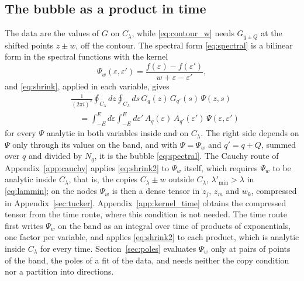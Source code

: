 \documentclass[aps,prb,reprint,a4paper]{revtex4-2}
\begin{document}
\subsection{The bubble as a product in time}
\label{sec:time}

The data are the values of $G$ on $C_\lambda$, while \eqref{eq:contour_w} needs $G_{q\pm Q}$ at the shifted points $z\pm w$, off the contour. The spectral form \eqref{eq:spectral} is a bilinear form in the spectral functions with the kernel
\begin{equation}
  \Psi_w(\varepsilon,\varepsilon')=\frac{f(\varepsilon)-f(\varepsilon')}{w+\varepsilon-\varepsilon'},
  \label{eq:kernel_psi}
\end{equation}
and \eqref{eq:shrink}, applied in each variable, gives
\begin{equation}
  \begin{aligned}
  &\frac1{(2\pi i)^2}\oint_{C_\lambda}dz\oint_{C_\lambda}ds\,G_q(z)\,G_{q'}(s)\,\Psi(z,s)\\
  &\quad=\int_{-E}^{E}d\varepsilon\int_{-E}^{E}d\varepsilon'\,A_q(\varepsilon)\,A_{q'}(\varepsilon')\,\Psi(\varepsilon,\varepsilon')
  \end{aligned}
  \label{eq:shrink2}
\end{equation}
for every $\Psi$ analytic in both variables inside and on $C_\lambda$. The right side depends on $\Psi$ only through its values on the band, and with $\Psi=\Psi_w$ and $q'=q+Q$, summed over $q$ and divided by $N_q$, it is the bubble \eqref{eq:spectral}. The Cauchy route of Appendix~\ref{app:cauchy} applies \eqref{eq:shrink2} to $\Psi_w$ itself, which requires $\Psi_w$ to be analytic inside $C_\lambda$, that is, the copies $C_\lambda\pm w$ outside $C_\lambda$, $\lambda'_{\min}>\lambda$ in \eqref{eq:lammin}; on the nodes $\Psi_w$ is then a dense tensor in $z_j$, $z_m$ and $w_k$, compressed in Appendix~\ref{sec:tucker}. Appendix~\ref{app:kernel_time} obtains the compressed tensor from the time route, where this condition is not needed. The time route first writes $\Psi_w$ on the band as an integral over time of products of exponentials, one factor per variable, and applies \eqref{eq:shrink2} to each product, which is analytic inside $C_\lambda$ for every time. Section~\ref{sec:poles} evaluates $\Psi_w$ only at pairs of points of the band, the poles of a fit of the data, and needs neither the copy condition nor a partition into directions.
\end{document}

